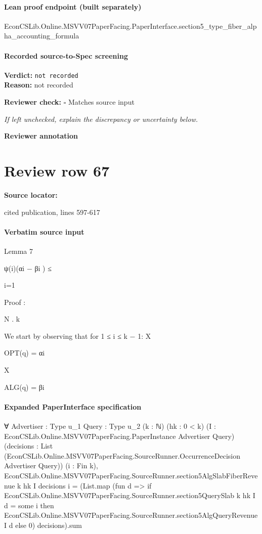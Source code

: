 \documentclass[10pt]{article}
\newcommand{\reviewerbox}{%
  \par\noindent\fbox{\parbox{0.96\linewidth}{\rule{0pt}{0.38in}}}\par
}
\newcommand{\reviewmatch}[1]{%
  \par\noindent\textbf{Reviewer check:} $\square$\; #1\par
  \noindent\emph{If left unchecked, explain the discrepancy or uncertainty below.}\par
}
\begin{document}
\paragraph{Lean proof endpoint (built separately)}\begin{ReviewVerbatim}
EconCSLib.Online.MSVV07PaperFacing.PaperInterface.section5_type_fiber_alpha_accounting_formula
\end{ReviewVerbatim}

\paragraph{Recorded source-to-Spec screening}
\textbf{Verdict:} \texttt{not recorded}
\\
\textbf{Reason:} not recorded
\reviewmatch{Matches source input}
\noindent\textbf{Reviewer annotation}\par
\reviewerbox
\clearpage
\hypertarget{source-claim-5e401fa02c10515e}{}
\section*{Review row 67}
\textbf{Source locator:} {\footnotesize\raggedright cited publication, lines 597-\allowbreak{}617\par}
\paragraph{Verbatim source input}
\begin{ReviewVerbatim}
Lemma 7

ψ(i)(αi − βi ) ≤

i=1

Proof :

N
.
k

We start by observing that for 1 ≤ i ≤ k − 1:
X

OPT(q) = αi

X

ALG(q) = βi
\end{ReviewVerbatim}


\paragraph{Expanded PaperInterface specification}
\begin{ReviewVerbatim}
∀ {Advertiser : Type u_1} {Query : Type u_2} (k : ℕ) (hk : 0 < k)
  (I : EconCSLib.Online.MSVV07PaperFacing.PaperInstance Advertiser Query)
  (decisions : List (EconCSLib.Online.MSVV07PaperFacing.SourceRunner.OccurrenceDecision Advertiser Query)) (i : Fin k),
  EconCSLib.Online.MSVV07PaperFacing.SourceRunner.section5AlgSlabFiberRevenue k hk I decisions i =
    (List.map
        (fun d =>
          if EconCSLib.Online.MSVV07PaperFacing.SourceRunner.section5QuerySlab k hk I d = some i then
            EconCSLib.Online.MSVV07PaperFacing.SourceRunner.section5AlgQueryRevenue I d
          else 0)
        decisions).sum
\end{ReviewVerbatim}
\end{document}
